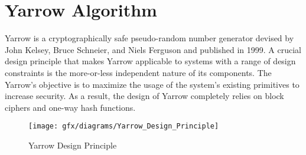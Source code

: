 \section{Yarrow Algorithm}
\label{sec:SoA:YA}
Yarrow is a cryptographically safe pseudo-random number generator devised by John Kelsey, Bruce Schneier, and Niels Ferguson and published in 1999. A crucial design principle that makes Yarrow applicable to systems with a range of design constraints is the more-or-less independent nature of its components. The Yarrow's objective is to maximize the usage of the system's existing primitives to increase security. As a result, the design of Yarrow completely relies on block ciphers and one-way hash functions.
\begin{figure}[htbp]
	\centering
	\texttt{[image: gfx/diagrams/Yarrow\_Design\_Principle]}
	\caption{Yarrow Design Principle}
	\label{fig:3:9}
\end{figure}

